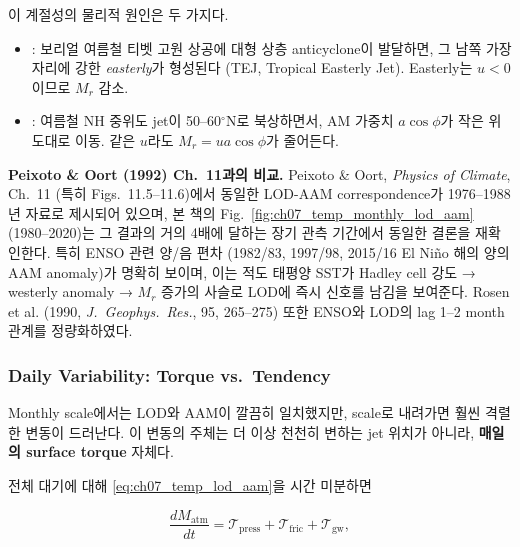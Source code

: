 이 계절성의 물리적 원인은 두 가지다.

\begin{itemize}
  \item {}: 보리얼 여름철 티벳 고원 상공에 대형
    상층 anticyclone이 발달하면, 그 남쪽 가장자리에 강한 \emph{easterly}가
    형성된다 (TEJ, Tropical Easterly Jet).  Easterly는 $u < 0$이므로
    $M_r$ 감소.
  \item {}: 여름철 NH 중위도 jet이 50--60$^\circ$N로
    북상하면서, AM 가중치 $a\cos\phi$가 작은 위도대로 이동.  같은 $u$라도
    $M_r = u a\cos\phi$가 줄어든다.
\end{itemize}



\begin{hisublock}
\textbf{Peixoto \& Oort (1992) Ch.~11과의 비교.}  Peixoto \& Oort,
\textit{Physics of Climate}, Ch.~11 (특히 Figs.~11.5--11.6)에서 동일한
LOD-AAM correspondence가 1976--1988년 자료로 제시되어 있으며, 본 책의
Fig.~\ref{fig:ch07_temp_monthly_lod_aam} (1980--2020)는 그 결과의 거의 4배에
달하는 장기 관측 기간에서 동일한 결론을 재확인한다.  특히 ENSO 관련 양/음
편차 (1982/83, 1997/98, 2015/16 El Ni\~no 해의 양의 AAM anomaly)가 명확히
보이며, 이는 적도 태평양 SST가 Hadley cell 강도 → westerly anomaly →
$M_r$ 증가의 사슬로 LOD에 즉시 신호를 남김을 보여준다.  Rosen et al. (1990,
\textit{J.\ Geophys.\ Res.}, 95, 265--275) 또한 ENSO와 LOD의 lag 1--2 month
관계를 정량화하였다.
\end{hisublock}


\subsubsection{Daily Variability: Torque vs.\ Tendency}

Monthly scale에서는 LOD와 AAM이 깔끔히 일치했지만,  scale로
내려가면 훨씬 격렬한 변동이 드러난다.  이 변동의 주체는 더 이상 천천히
변하는 jet 위치가 아니라, \textbf{매일의 surface torque} 자체다.

전체 대기에 대해 \eqref{eq:ch07_temp_lod_aam}을 시간 미분하면

\begin{equation}\label{eq:ch07_temp_tendency_torque}
  \frac{dM_{\text{atm}}}{dt} = \mathcal{T}_{\text{press}}
    + \mathcal{T}_{\text{fric}} + \mathcal{T}_{\text{gw}},
\end{equation}


